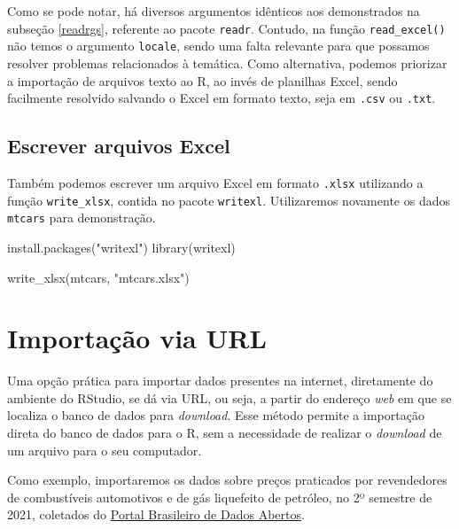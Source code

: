\documentclass[
  brazilian,
]{book}
\newenvironment{Shaded}{\begin{snugshade}}{\end{snugshade}}
\newcommand{\FunctionTok}[1]{\textcolor[rgb]{0.00,0.00,0.00}{#1}}
\newcommand{\NormalTok}[1]{#1}
\newcommand{\StringTok}[1]{\textcolor[rgb]{0.31,0.60,0.02}{#1}}
\begin{document}
Como se pode notar, há diversos argumentos idênticos aos demonstrados na subseção \ref{readrgs}, referente ao pacote \texttt{readr}. Contudo, na função \texttt{read\_excel()} não temos o argumento \texttt{locale}, sendo uma falta relevante para que possamos resolver problemas relacionados à temática. Como alternativa, podemos priorizar a importação de arquivos texto ao R, ao invés de planilhas Excel, sendo facilmente resolvido salvando o Excel em formato texto, seja em \texttt{.csv} ou \texttt{.txt}.

\hypertarget{escrever-arquivos-excel}{%
\subsection{Escrever arquivos Excel}\label{escrever-arquivos-excel}}

Também podemos escrever um arquivo Excel em formato \texttt{.xlsx} utilizando a função \texttt{write\_xlsx}, contida no pacote \texttt{writexl}. Utilizaremos novamente os dados \texttt{mtcars} para demonstração.

\begin{Shaded}
\begin{Highlighting}[]
\FunctionTok{install.packages}\NormalTok{(}\StringTok{"writexl"}\NormalTok{)}
\FunctionTok{library}\NormalTok{(writexl)}

\FunctionTok{write\_xlsx}\NormalTok{(mtcars, }\StringTok{"mtcars.xlsx"}\NormalTok{)}
\end{Highlighting}
\end{Shaded}

\hypertarget{importauxe7uxe3o-via-url}{%
\section{Importação via URL}\label{importauxe7uxe3o-via-url}}

Uma opção prática para importar dados presentes na internet, diretamente do ambiente do RStudio, se dá via URL, ou seja, a partir do endereço \emph{web} em que se localiza o banco de dados para \emph{download}. Esse método permite a importação direta do banco de dados para o R, sem a necessidade de realizar o \emph{download} de um arquivo para o seu computador.

Como exemplo, importaremos os dados sobre preços praticados por revendedores de combustíveis automotivos e de gás liquefeito de petróleo, no 2º semestre de 2021, coletados do \href{https://dados.gov.br/dataset/serie-historica-de-precos-de-combustiveis-por-revenda/resource/baf0fa4d-488a-45b4-8ba4-d0c9f447f843}{Portal Brasileiro de Dados Abertos}.
\end{document}

